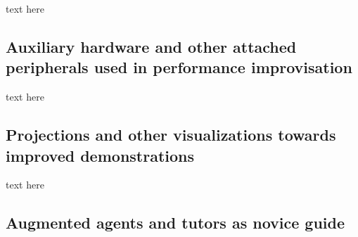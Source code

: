 \documentclass[sigchi, review]{acmart}
\begin{document}
text here

\subsection{Auxiliary hardware and other attached peripherals used in performance improvisation}
\label{subsec: aux}

text here 

\subsection{Projections and other visualizations towards improved demonstrations}
\label{subsec: viz}

text here  

\subsection{Augmented agents and tutors as novice guide}
\label{subsec: agent}

\end{document}
